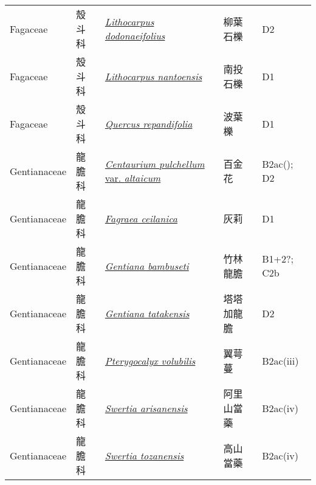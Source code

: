 {\begin{longtable}{p{2.5cm}p{2.5cm}p{4.5cm}p{2.5cm}p{3cm}}
    Fagaceae & 殼斗科 & \href{http://www.theplantlist.org/tpl1.1/search?q=Lithocarpus+dodonaeifolius}{\textit{Lithocarpus dodonaeifolius} } & 柳葉石櫟 & D2 \index{Lithocarpus@\textit{Lithocarpus}!dodonaeifolius@\textit{dodonaeifolius}}  \index{柳葉石櫟} \\
    Fagaceae & 殼斗科 & \href{http://www.theplantlist.org/tpl1.1/search?q=Lithocarpus+nantoensis}{\textit{Lithocarpus nantoensis} } & 南投石櫟 & D1 \index{Lithocarpus@\textit{Lithocarpus}!nantoensis@\textit{nantoensis}}  \index{南投石櫟} \\
    Fagaceae & 殼斗科 & \href{http://www.theplantlist.org/tpl1.1/search?q=Quercus+repandifolia}{\textit{Quercus repandifolia} } & 波葉櫟 & D1 \index{Quercus@\textit{Quercus}!repandifolia@\textit{repandifolia}}  \index{波葉櫟} \\
    Gentianaceae & 龍膽科 & \href{http://www.theplantlist.org/tpl1.1/search?q=Centaurium+pulchellum+var.+altaicum}{\textit{Centaurium pulchellum} var. \textit{altaicum} } & 百金花 & B2ac(); D2 \index{Centaurium@\textit{Centaurium}!pulchellum@\textit{pulchellum}!var. altaicum@var. \textit{altaicum}}  \index{百金花} \\
    Gentianaceae & 龍膽科 & \href{http://www.theplantlist.org/tpl1.1/search?q=Fagraea+ceilanica}{\textit{Fagraea ceilanica} } & 灰莉 & D1 \index{Fagraea@\textit{Fagraea}!ceilanica@\textit{ceilanica}}  \index{灰莉} \\
    Gentianaceae & 龍膽科 & \href{http://www.theplantlist.org/tpl1.1/search?q=Gentiana+bambuseti}{\textit{Gentiana bambuseti} } & 竹林龍膽 & B1+2?; C2b \index{Gentiana@\textit{Gentiana}!bambuseti@\textit{bambuseti}}  \index{竹林龍膽} \\
    Gentianaceae & 龍膽科 & \href{http://www.theplantlist.org/tpl1.1/search?q=Gentiana+tatakensis}{\textit{Gentiana tatakensis} } & 塔塔加龍膽 & D2 \index{Gentiana@\textit{Gentiana}!tatakensis@\textit{tatakensis}}  \index{塔塔加龍膽} \\
    Gentianaceae & 龍膽科 & \href{http://www.theplantlist.org/tpl1.1/search?q=Pterygocalyx+volubilis}{\textit{Pterygocalyx volubilis} } & 翼萼蔓 & B2ac(iii) \index{Pterygocalyx@\textit{Pterygocalyx}!volubilis@\textit{volubilis}}  \index{翼萼蔓} \\
    Gentianaceae & 龍膽科 & \href{http://www.theplantlist.org/tpl1.1/search?q=Swertia+arisanensis}{\textit{Swertia arisanensis} } & 阿里山當藥 & B2ac(iv) \index{Swertia@\textit{Swertia}!arisanensis@\textit{arisanensis}}  \index{阿里山當藥} \\
    Gentianaceae & 龍膽科 & \href{http://www.theplantlist.org/tpl1.1/search?q=Swertia+tozanensis}{\textit{Swertia tozanensis} } & 高山當藥 & B2ac(iv) \index{Swertia@\textit{Swertia}!tozanensis@\textit{tozanensis}}  \index{高山當藥} \\

\end{longtable}}
